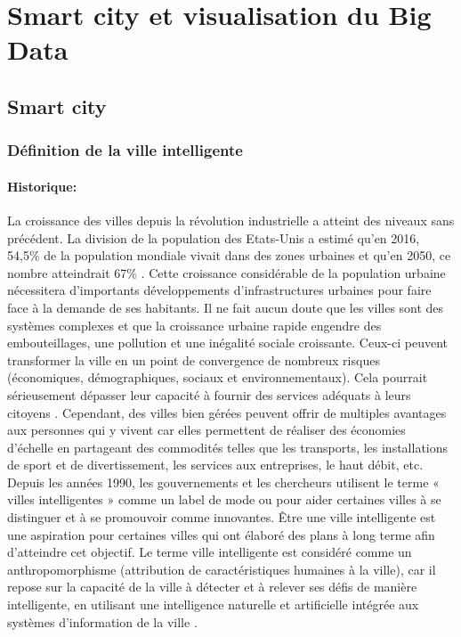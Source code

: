 \documentclass[french, a4paper, 12pt]{report}
\begin{document}
\chapter{Smart city  et  visualisation du Big Data}
\section{Smart city}
\subsection{Définition de la ville intelligente}
\subsubsection{Historique:}
La croissance des villes depuis la révolution industrielle a atteint des niveaux sans précédent. La division de la population des Etats-Unis a estimé qu'en 2016, 54,5\% de la population mondiale vivait dans des zones urbaines et qu'en 2050, ce nombre atteindrait 67\% \cite{0}. Cette croissance considérable de la population urbaine nécessitera d’importants développements d’infrastructures urbaines pour faire face à la demande de ses habitants. Il ne fait aucun doute que les villes sont des systèmes complexes et que la croissance urbaine rapide engendre des embouteillages, une pollution et une inégalité sociale croissante. Ceux-ci peuvent transformer la ville en un point de convergence de nombreux risques (économiques, démographiques, sociaux et environnementaux). Cela pourrait sérieusement dépasser leur capacité à fournir des services adéquats à leurs citoyens \cite{1}. Cependant, des villes bien gérées peuvent offrir de multiples avantages aux personnes qui y vivent car elles permettent de réaliser des économies d’échelle en partageant des commodités telles que les transports, les installations de sport et de divertissement, les services aux entreprises, le haut débit, etc.
Depuis les années 1990, les gouvernements et les chercheurs utilisent le terme « villes intelligentes » comme un label de mode ou pour aider certaines villes à se distinguer et à se promouvoir comme innovantes. Être une ville intelligente est une aspiration pour certaines villes qui ont élaboré des plans à long terme afin d’atteindre cet objectif. Le terme ville intelligente est considéré comme un anthropomorphisme (attribution de caractéristiques humaines à la ville), car il repose sur la capacité de la ville à détecter et à relever ses défis de manière intelligente, en utilisant une intelligence naturelle et artificielle intégrée aux systèmes d’information de la ville \cite{2}.
\end{document}
